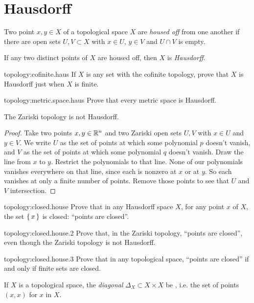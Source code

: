 \section{Hausdorff}
Two point \(x,y \in X\) of a topological space \(X\) are \emph{housed off} from one another if there are open sets \(U,V \subset X\) with \(x \in U\), \(y \in V\) and \(U\cap V\) is empty.
\begin{center}

\end{center}
If any two distinct points of \(X\) are housed off, then \(X\) is \emph{Hausdorff}.
\begin{problem}{topology:cofinite.haus}
If \(X\) is any set with the cofinite topology, prove that \(X\) is Hausdorff just when \(X\) is finite.
\end{problem}
\begin{problem}{topology:metric.space.haus}
Prove that every metric space is Hausdorff.
\end{problem}
\begin{lemma}
The Zariski topology is not Hausdorff.
\end{lemma}
\begin{proof}
Take two points \(x, y \in \mathbb{R}^{n}\) and two Zariski open sets \(U, V\) with \(x \in U\) and \(y \in V\).
We write \(U\) as the set of points at which some polynomial \(p\) doesn't vanish, and \(V\) as the set of points at which some polynomial \(q\) doesn't vanish.
Draw the line from \(x\) to \(y\).
Restrict the polynomials to that line.
None of our polynomials vanishes everywhere on that line, since each is nonzero at \(x\) or at \(y\).
So each vanishes at only a finite number of points.
Remove those points to see that \(U\) and \(V\) intersection.
\end{proof}
\begin{problem}{topology:closed.house}
Prove that in any Hausdorff space \(X\), for any point \(x\) of \(X\), the set \(\set{x}\) is closed: ``points are closed''.
\end{problem}
\begin{problem}{topology:closed.house.2}
Prove that, in the Zariski topology, ``points are closed'', even though the Zariski topology is not Hausdorff.
\end{problem}
\begin{problem}{topology:closed.house.3}
Prove that in any topological space, ``points are closed'' if and only if finite sets are closed.
\end{problem}
If \(X\) is a topological space, the \emph{diagonal} \(\Delta_X \subset X \times X\) be , i.e. the set of points \((x,x)\) for \(x\) in \(X\).

